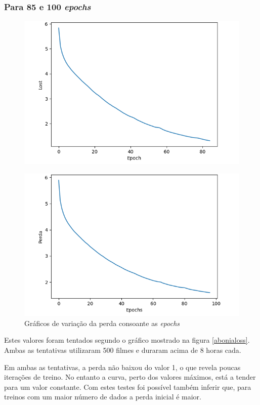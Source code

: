 \documentclass{article}
\begin{document}
\subsubsection{Para 85 e 100 \textit{epochs}}
\begin{figure}[htb]
    \centering
    \includegraphics[scale=0.35]{85loss}
    \caption{}
    \label{85loss}
\end{figure}
\begin{figure}[htb]
    \centering
    \includegraphics[scale=0.35]{100epochs}
    \caption{Gráficos de variação da perda consoante as \textit{epochs}}
    \label{100loss}
\end{figure}
Estes valores foram tentados segundo o gráfico mostrado na figura \ref{abonialoss}. Ambas as tentativas utilizaram 500 filmes e duraram acima de 8 horas cada.

Em ambas as tentativas, a perda não baixou do valor 1, o que revela poucas iterações de treino. No entanto a curva, perto dos valores máximos, está a tender para um valor constante. Com estes testes foi possível também inferir que, para treinos com um maior número de dados a perda inicial é maior.
\end{document}
